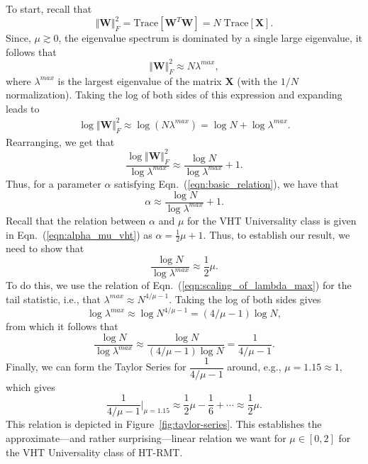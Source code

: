 {To start, recall that 
$$ 
\Vert \mathbf{W}\Vert_{F}^{2}=\mbox{Trace}[\mathbf{W}^{T}\mathbf{W}]=N\;\mbox{Trace}[\mathbf{X}]  .
$$
Since, $\mu \gtrsim 0$, 
the eigenvalue spectrum is dominated by a single large eigenvalue, it follows that
$$
\Vert \mathbf{W}\Vert_{F}^{2}\approx N\lambda^{max}  , 
$$
where $\lambda^{max}$ is the largest eigenvalue of the matrix $\mathbf{X}$ (with the $1/N$ normalization).
Taking the log of both sides of this expression and expanding leads to
\begin{eqnarray*}
\log\Vert \mathbf{W}\Vert_{F}^{2} 
   \approx \log \left( N\lambda^{max} \right) 
   =       \log N+\log\lambda^{max}  .
\end{eqnarray*}
Rearranging, we get that 
$$
\dfrac{\log\Vert \mathbf{W}\Vert_{F}^{2}}{\log\lambda^{max}}\approx \dfrac{\log N}{\log\lambda^{max}}+1  .
$$
Thus, for a parameter $\alpha$ satisfying Eqn.~(\ref{eqn:basic_relation}), we have that 
$$
\alpha\approx \dfrac{\log N}{\log\lambda^{max}}+1  .
$$
Recall that the relation between $\alpha$ and $\mu$ for the VHT Universality class is given in Eqn.~(\ref{eqn:alpha_mu_vht}) as
$ %
\alpha=\frac{1}{2}\mu+1  .
$ %
Thus, to establish our result, we need to show that
$$
\dfrac{\log N}{\log\lambda^{max}}\approx\dfrac{1}{2}\mu  .
$$
To do this, we use the relation of Eqn.~(\ref{eqn:scaling_of_lambda_max}) for the tail statistic, i.e., that 
$ %
\lambda^{max}\approx N^{4/\mu-1}  .
$ %
Taking the log of both sides gives
$$
\log\lambda^{max}\approx\log N^{4/\mu-1}=(4/\mu-1)\log N  ,
$$
from which it follows that
$$
\dfrac{\log N}{\log\lambda^{max}}\approx\dfrac{\log N}{(4/\mu-1)\log N}=\dfrac{1}{4/\mu-1}   .
$$
Finally, we can form the Taylor Series for $\dfrac{1}{4/\mu-1}$ around, e.g., $\mu=1.15\approx 1$, which gives 
$$
\dfrac{1}{4/\mu-1}\bigg\rvert_{\mu=1.15}\approx\dfrac{1}{2}\mu-\dfrac{1}{6}+\cdots\approx\dfrac{1}{2}\mu  .
$$
This relation is depicted in Figure~\ref{fig:taylor-series}.
This establishes the approximate---and rather surprising---linear relation we want for $\mu\in[0,2]$ for
the VHT Universality class of HT-RMT.

}
